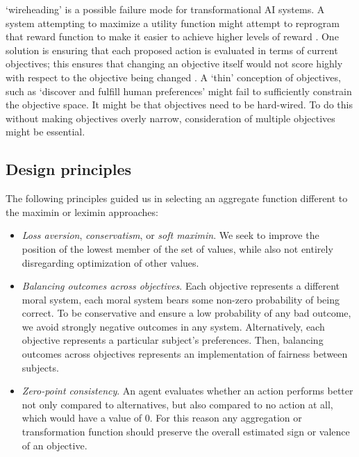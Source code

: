 `wireheading' is a possible failure mode for transformational AI systems. A system attempting to maximize a utility function might attempt to reprogram that reward function to make it easier to achieve higher levels of reward \cite{demski_a_stable_2017}. One solution is ensuring that each proposed action is evaluated in terms of current objectives; this ensures that changing an objective itself would not score highly with respect to the objective being changed \cite{dewey_learning_2011}. A `thin' conception of objectives, such as `discover and fulfill human preferences' might fail to sufficiently constrain the objective space. It might be that objectives need to be hard-wired. To do this without making objectives overly narrow, consideration of multiple objectives might be essential.




\subsection{Design principles}
The following principles guided us in selecting an aggregate function different to the maximin or leximin approaches:
\begin{itemize}
    \item \textit{Loss aversion}, \textit{conservatism}, or \textit{soft maximin}. We seek to improve the position of the lowest member of the set of values, while also not entirely disregarding optimization of other values.
    \item \textit{Balancing outcomes across objectives}. %
    Each objective represents a different moral system, each moral system bears some non-zero probability of being correct. To be conservative and ensure a low probability of any bad outcome, we avoid strongly negative outcomes in any system. Alternatively, each objective represents a particular subject's preferences. Then, balancing outcomes across objectives represents an implementation of fairness between subjects.
    \item \textit{Zero-point consistency}. An agent evaluates whether an action performs better not only compared to alternatives, but also compared to no action at all, which would have a value of 0. For this reason any aggregation or transformation function should preserve the overall estimated sign or valence of an objective.
\end{itemize}

